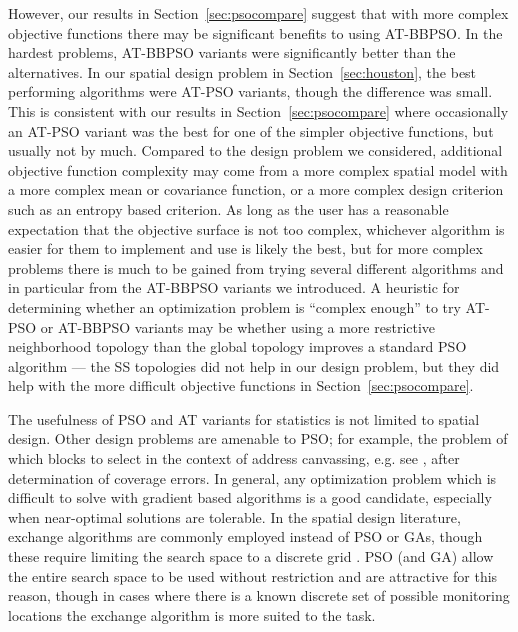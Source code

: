 \documentclass[cmbright]{staauth}
\begin{document}
However, our results in Section~\ref{sec:psocompare} suggest that with more complex objective functions there may be significant benefits to using AT-BBPSO. In the hardest problems, AT-BBPSO variants were significantly better than the alternatives. In our spatial design problem in Section~\ref{sec:houston}, the best performing algorithms were AT-PSO variants, though the difference was small. This is consistent with our results in Section~\ref{sec:psocompare} where occasionally an AT-PSO variant was the best for one of the simpler objective functions, but usually not by much. Compared to the design problem we considered, additional objective function complexity may come from a more complex spatial model with a more complex mean or covariance function, or a more complex design criterion such as an entropy based criterion. As long as the user has a reasonable expectation that the objective surface is not too complex, whichever algorithm is easier for them to implement and use is likely the best, but for more complex problems there is much to be gained from trying several different algorithms and in particular from the AT-BBPSO variants we introduced. A heuristic for determining whether an optimization problem is ``complex enough'' to try AT-PSO or AT-BBPSO variants may be whether using a more restrictive neighborhood topology than the global topology improves a standard PSO algorithm --- the SS topologies did not help in our design problem, but they did help with the more difficult objective functions in Section~\ref{sec:psocompare}.

The usefulness of PSO and AT variants for statistics is not limited to spatial design. Other design problems are amenable to PSO; for example, the problem of which blocks to select in the context of address canvassing, e.g. see \cite{young2016zero}, after determination of coverage errors. In general, any optimization problem which is difficult to solve with gradient based algorithms is a good candidate, especially when near-optimal solutions are tolerable. In the spatial design literature, exchange algorithms are commonly employed instead of PSO or GAs, though these require limiting the search space to a discrete grid \citep{nychka1998design,wikle1999space,wikle2005dynamic}. PSO (and GA) allow the entire search space to be used without restriction and are attractive for this reason, though in cases where there is a known discrete set of possible monitoring locations the exchange algorithm is more suited to the task.




\end{document}
